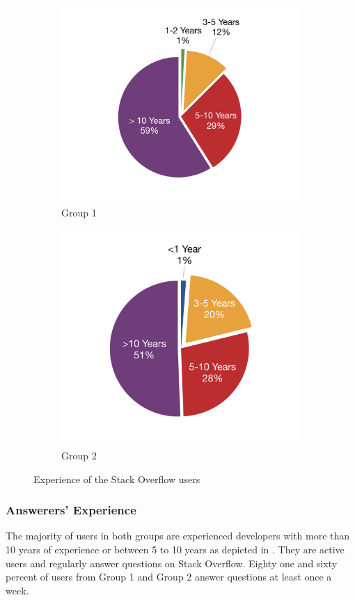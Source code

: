 \documentclass[10pt,journal,compsoc]{IEEEtran}
\begin{document}
\begin{figure}
	\begin{subfigure}{.25\textwidth}
		\centering
		\includegraphics[width=.6\linewidth]{survey_exp_1-crop}
		\caption{Group 1}
		\label{fig:survey_group1_exp}
	\end{subfigure}%
	\begin{subfigure}{.25\textwidth}
		\centering
		\includegraphics[width=.62\linewidth]{survey_exp_2-crop}
		\caption{Group 2}
		\label{fig:survey_group2_exp}
	\end{subfigure}
	\caption{Experience of the Stack Overflow users}
	\label{fig:survey_exp}
\end{figure}

\subsubsection{Answerers' Experience}
The majority of users in both groups are experienced developers 
with more than 10 years of experience or between 5 to 10 years 
as depicted in . They are active users and
regularly answer questions on Stack Overflow.
Eighty one and sixty percent of users from Group 1 and Group 2 
answer questions at least once a week.
\end{document}
